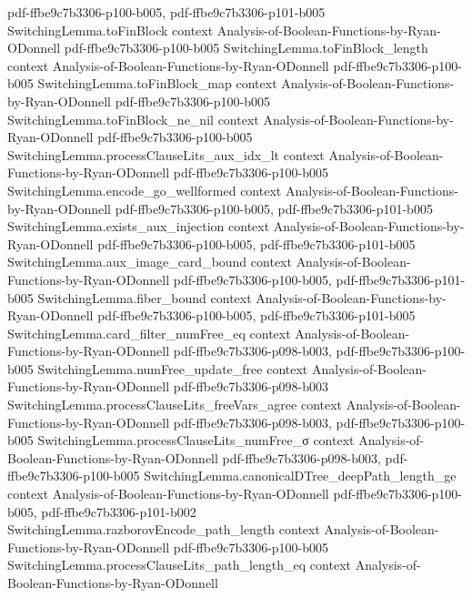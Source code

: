 \begin{lemma}
  {pdf-ffbe9c7b3306-p100-b005,
    pdf-ffbe9c7b3306-p101-b005}
\proofstep
  {SwitchingLemma.toFinBlock}
  {context}
  {Analysis-of-Boolean-Functions-by-Ryan-ODonnell}
  {pdf-ffbe9c7b3306-p100-b005}
\proofstep
  {SwitchingLemma.toFinBlock_length}
  {context}
  {Analysis-of-Boolean-Functions-by-Ryan-ODonnell}
  {pdf-ffbe9c7b3306-p100-b005}
\proofstep
  {SwitchingLemma.toFinBlock_map}
  {context}
  {Analysis-of-Boolean-Functions-by-Ryan-ODonnell}
  {pdf-ffbe9c7b3306-p100-b005}
\proofstep
  {SwitchingLemma.toFinBlock_ne_nil}
  {context}
  {Analysis-of-Boolean-Functions-by-Ryan-ODonnell}
  {pdf-ffbe9c7b3306-p100-b005}
\proofstep
  {SwitchingLemma.processClauseLits_aux_idx_lt}
  {context}
  {Analysis-of-Boolean-Functions-by-Ryan-ODonnell}
  {pdf-ffbe9c7b3306-p100-b005}
\proofstep
  {SwitchingLemma.encode_go_wellformed}
  {context}
  {Analysis-of-Boolean-Functions-by-Ryan-ODonnell}
  {pdf-ffbe9c7b3306-p100-b005,
    pdf-ffbe9c7b3306-p101-b005}
\proofstep
  {SwitchingLemma.exists_aux_injection}
  {context}
  {Analysis-of-Boolean-Functions-by-Ryan-ODonnell}
  {pdf-ffbe9c7b3306-p100-b005,
    pdf-ffbe9c7b3306-p101-b005}
\proofstep
  {SwitchingLemma.aux_image_card_bound}
  {context}
  {Analysis-of-Boolean-Functions-by-Ryan-ODonnell}
  {pdf-ffbe9c7b3306-p100-b005,
    pdf-ffbe9c7b3306-p101-b005}
\proofstep
  {SwitchingLemma.fiber_bound}
  {context}
  {Analysis-of-Boolean-Functions-by-Ryan-ODonnell}
  {pdf-ffbe9c7b3306-p100-b005,
    pdf-ffbe9c7b3306-p101-b005}
\proofstep
  {SwitchingLemma.card_filter_numFree_eq}
  {context}
  {Analysis-of-Boolean-Functions-by-Ryan-ODonnell}
  {pdf-ffbe9c7b3306-p098-b003,
    pdf-ffbe9c7b3306-p100-b005}
\proofstep
  {SwitchingLemma.numFree_update_free}
  {context}
  {Analysis-of-Boolean-Functions-by-Ryan-ODonnell}
  {pdf-ffbe9c7b3306-p098-b003}
\proofstep
  {SwitchingLemma.processClauseLits_freeVars_agree}
  {context}
  {Analysis-of-Boolean-Functions-by-Ryan-ODonnell}
  {pdf-ffbe9c7b3306-p098-b003,
    pdf-ffbe9c7b3306-p100-b005}
\proofstep
  {SwitchingLemma.processClauseLits_numFree_σ}
  {context}
  {Analysis-of-Boolean-Functions-by-Ryan-ODonnell}
  {pdf-ffbe9c7b3306-p098-b003,
    pdf-ffbe9c7b3306-p100-b005}
\proofstep
  {SwitchingLemma.canonicalDTree_deepPath_length_ge}
  {context}
  {Analysis-of-Boolean-Functions-by-Ryan-ODonnell}
  {pdf-ffbe9c7b3306-p100-b005,
    pdf-ffbe9c7b3306-p101-b002}
\proofstep
  {SwitchingLemma.razborovEncode_path_length}
  {context}
  {Analysis-of-Boolean-Functions-by-Ryan-ODonnell}
  {pdf-ffbe9c7b3306-p100-b005}
\proofstep
  {SwitchingLemma.processClauseLits_path_length_eq}
  {context}
  {Analysis-of-Boolean-Functions-by-Ryan-ODonnell}

\end{lemma}
